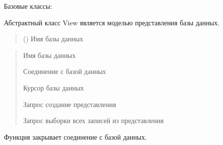 \documentclass[letterpaper,10pt,russian]{sphinxmanual}
\begin{document}
\begin{fulllineitems}
\label{\detokenize{database.sqlite3_interface.views:database.sqlite3_interface.views.view.View}}
\pysigstartsignatures
{}
\pysigstopsignatures
\sphinxAtStartPar
Базовые классы: 

\sphinxAtStartPar
Абстрактный класс View \sphinxhyphen{} является моделью представления базы данных.
\begin{quote}\begin{description}
\sphinxAtStartPar
{} () \textendash{} Имя базы данных

\end{description}\end{quote}
\begin{description}
\begin{quote}\begin{description}
\sphinxAtStartPar
Имя базы данных

\sphinxAtStartPar
Соединение с базой данных

\sphinxAtStartPar
Курсор базы данных

\sphinxAtStartPar
Запрос создание представления

\sphinxAtStartPar
Запрос выборки всех записей из представления

\end{description}\end{quote}

\end{description}

\begin{fulllineitems}
\label{\detokenize{database.sqlite3_interface.views:database.sqlite3_interface.views.view.View.close_connect_db}}
\pysigstartsignatures
{}
\pysigstopsignatures
\sphinxAtStartPar
Функция закрывает соединение с базой данных.


\end{fulllineitems}
\end{fulllineitems}
\end{document}
